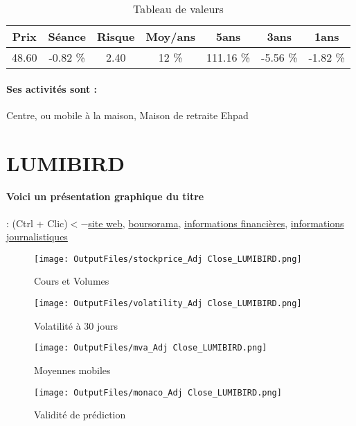 \documentclass[11pt,a4paper]{report}%
\begin{document}
\begin{table}[H]
  \centering
    \begin{tabular}{|c|c|c|c|c|c|c|}
    \hline
    Prix & Séance & Risque  & Moy/ans & 5ans & 3ans & 1ans \\
    \hline
    48.60 &    -0.82 \%    & 2.40 & 12 \% & 111.16 \% & -5.56 \% & -1.82 \% \\
    \hline
    \end{tabular}%
        \label{tab:table_LNA SANTE}%
      \caption{Tableau de valeurs}
\end{table}%

\paragraph{Ses activités sont : } Centre, ou mobile à la maison, Maison de retraite Ehpad 
    
    \newpage

\section{LUMIBIRD}

\paragraph{Voici un présentation graphique du titre} : (Ctrl + Clic)$<-$\href{https://www.lumibird.com/}{site web}, \href{https://www.boursorama.com/cours/1rPLBIRD}{boursorama}, \href{https://www.qwant.com/?q=site:https:%2f%2fwww.easybourse.com%2faction-societe%2fLUMIBIRD&t=web&client=ext-firefox-hp}{informations financières}, \href{https://bourse.lerevenu.com/cours-de-bourse/fiche-valeur-synthese/LUMIBIRD/LBIRD-FR}{informations journalistiques}
\begin{figure}[!htb]
   \begin{minipage}{0.5\textwidth}
     \centering
     \texttt{[image: OutputFiles/stockprice\_Adj Close\_LUMIBIRD.png]}
     \caption{Cours et Volumes}\label{Fig:price_LUMIBIRD}
   \end{minipage}\hfill
   \begin{minipage}{0.5\textwidth}
     \centering
     \texttt{[image: OutputFiles/volatility\_Adj Close\_LUMIBIRD.png]}
     \caption{Volatilité à 30 jours}\label{Fig:volat_LUMIBIRD}
   \end{minipage}
\end{figure}
\begin{figure}[!htb]
   \begin{minipage}{0.5\textwidth}
     \centering
     \texttt{[image: OutputFiles/mva\_Adj Close\_LUMIBIRD.png]}
     \caption{Moyennes mobiles}\label{Fig:mva_LUMIBIRD}
   \end{minipage}\hfill
   \begin{minipage}{0.5\textwidth}
     \centering
     \texttt{[image: OutputFiles/monaco\_Adj Close\_LUMIBIRD.png]}
     \caption{Validité de prédiction}\label{Fig:prediction_LUMIBIRD}
   \end{minipage}
\end{figure}
\end{document}
